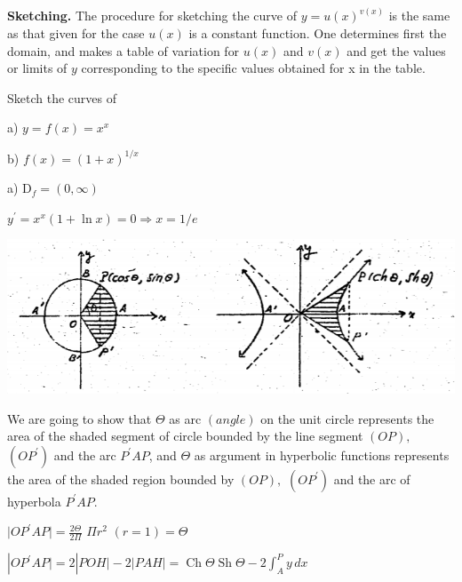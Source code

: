 \documentclass[11pt]{amsbook}
\begin{document}

\textbf{Sketching.} The procedure for sketching the curve of 
$y = u(x)^{v(x)}$ is the same as that given for the case $u(x)$ is a constant function. 
One determines first the domain, and makes a table of variation for $u(x)$ and $v(x)$ 
and get the values or limits of $y$ corresponding to the specific values obtained for x in the table.\\


\begin{exmp}

	Sketch the curves of

	\begin{multicols}{2}
		a) $y = f(x) = x^x$
	
		b) $f(x) = (1+x)^{1/x}$
	\end{multicols}

	\begin{hSolution}

		a) $\textrm{D}_f = (0,\infty)$
	

		$y^\prime = x^x(1+\ln x) = 0 \Rightarrow x = 1/e$

	\end{hSolution}

\end{exmp}
    \begin{center}
        \includegraphics{images/b1p2-417-fig01.png}
    \end{center}
    
    We are going to show that $\Theta$ as arc $(angle)$ on the unit
    circle represents the area of the shaded segment of circle bounded by the line segment $(OP),$ $(OP^\prime)$ and the arc $P^\prime AP$, and $\Theta$ as argument in hyperbolic functions represents the area of the shaded region bounded by $(OP),$ $(OP^\prime)$ and the arc of hyperbola $P^\prime AP$.
    
    \begin{hEnumerateAlpha}
        \item $|OP^\prime AP \vert = \frac{2\Theta}{2\Pi} $ $ \Pi r^2 $ $(r = 1) = \Theta$
        \item $|OP^\prime AP \vert = 2 |POH \vert -2|PAH \vert = \operatorname{Ch}\Theta \operatorname{Sh}\Theta - 2 \int_A^P y \,dx$
    \end{hEnumerateAlpha}
    
\end{document}
